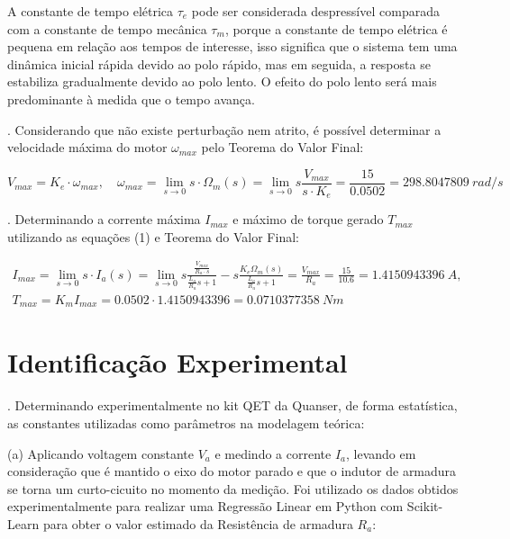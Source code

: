 \documentclass[10pt]{article}
\begin{document}
\quad A constante de tempo elétrica $\tau_e$ pode ser considerada despressível
comparada com a constante de tempo mecânica $\tau_m$,
porque a constante de tempo elétrica é pequena em relação aos tempos de interesse,
isso significa que o sistema tem uma dinâmica inicial rápida devido ao polo rápido,
mas em seguida, a resposta se estabiliza gradualmente devido ao polo lento.
O efeito do polo lento será mais predominante à medida que o tempo avança.

. Considerando que não existe perturbação nem atrito,
é possível determinar a velocidade máxima do motor $\omega_{max}$
pelo Teorema do Valor Final:

\begin{equation}
    V_{max} = K_e \cdot \omega_{max},
    \quad \omega_{max} = \lim_{s \rightarrow 0}s \cdot \Omega_m(s) = \lim_{s \rightarrow 0} s\frac{V_{max}}{s \cdot K_e} = \frac{15}{0.0502} = 298.8047809 \ rad/s
\end{equation}

. Determinando a corrente máxima $I_{max}$ e máximo de torque gerado $T_{max}$ utilizando as equações (1) e Teorema do Valor Final:

\begin{equation}
\begin{aligned}
    I_{max} = \lim_{s \rightarrow 0}s \cdot I_a(s)
    = \lim_{s \rightarrow 0} s\frac{\frac{V_{max}}{R_a \cdot s}}{\frac{L_a}{R_a}s+1}-s\frac{K_e \Omega_m(s)}{\frac{L_a}{R_a}s+1}
    = \frac{V_{max}}{R_a} = \frac{15}{10.6} = 1.4150943396 \ A, \\
    T_{max} = K_m I_{max} = 0.0502 \cdot 1.4150943396 = 0.0710377358 \ Nm
\end{aligned}
\end{equation}

\section{Identificação Experimental}

. Determinando experimentalmente no kit QET da Quanser, de forma estatística,
as constantes utilizadas como parâmetros na modelagem teórica:

\quad (a) Aplicando voltagem constante $V_a$ e medindo a corrente $I_a$,
levando em consideração que é mantido o eixo do motor parado
e que o indutor de armadura se torna um curto-cicuito no momento da medição.
Foi utilizado os dados obtidos experimentalmente para realizar uma Regressão Linear em Python com Scikit-Learn
para obter o valor estimado da Resistência de armadura $R_a$:
\end{document}
